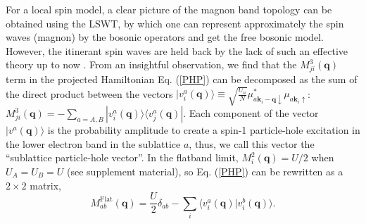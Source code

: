 \documentclass[amsmath,superscriptaddress,showpacs,aps,prl,twocolumn]{revtex4-1}
\begin{document}
\par For a local spin model, a clear picture of the magnon band topology can be obtained using the LSWT, by which one can represent approximately the spin waves (magnon) by the bosonic operators and get the free bosonic model. However, the itinerant spin waves are held back by the lack of such an effective theory up to now \cite{Su_PRB2018}. From an insightful observation, we find that the $M^3_{ji}(\mathbf{q})$ term in the projected Hamiltonian Eq. (\ref{PHP}) can be decomposed as the sum of the direct product between the vectors $|v^a_i(\mathbf{q})\rangle\equiv\sqrt{\frac{U_a}{N}}\mu^{\ast}_{a\mathbf{k}_i-\mathbf{q}\downarrow}\mu_{a\mathbf{k}_{i}\uparrow}$: $M^3_{ji}(\mathbf{q})=-\sum_{a=A,B}|v^a_i(\mathbf{q})\rangle\langle v^a_j(\mathbf{q})|$. Each component of the vector $|v^a(\mathbf{q})\rangle$ is the probability amplitude to create a spin-1 particle-hole excitation in the lower electron band in the sublattice $a$, thus, we call this vector the ``sublattice particle-hole vector''. In the flatband limit, $M^2_i(\mathbf{q})=U/2$ when $U_A=U_B=U$ (see supplement material), so Eq. (\ref{PHP}) can be rewritten as a $2\times2$ matrix,
\begin{equation}\label{effective}
M^\text{Flat}_{ab}(\mathbf{q})=\frac{U}{2}\delta_{ab}-\sum_i\langle v_i^a(\mathbf{q})|v_i^b(\mathbf{q})\rangle.
\end{equation}
\end{document}
